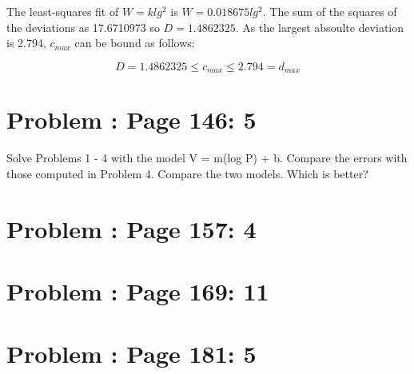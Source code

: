\documentclass[]{article}
\begin{document}
The least-squares fit of \(W = klg^2\) is \(W = 0.018675lg^2\). The sum
of the squares of the deviations as 17.6710973 so \(D = 1.4862325\). As
the largest absoulte deviation is 2.794, \(c_{max}\) can be bound as
follows:

\[D = 1.4862325 \leq c_{max} \leq 2.794 = d_{max}\]

\section{Problem : Page 146: 5}\label{problem-page-146-5}

Solve Problems 1 - 4 with the model V = m(log P) + b. Compare the errors
with those computed in Problem 4. Compare the two models. Which is
better?

\section{Problem : Page 157: 4}\label{problem-page-157-4}

\section{Problem : Page 169: 11}\label{problem-page-169-11}

\section{Problem : Page 181: 5}\label{problem-page-181-5}
\end{document}
